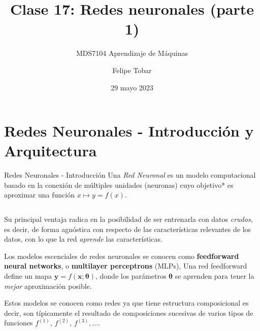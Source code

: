 \documentclass[handout, 9pt]{beamer}
\title{Clase 17: Redes neuronales (parte 1)}
\subtitle{MDS7104 Aprendizaje de Máquinas}
\date{29 mayo 2023}
\author{Felipe Tobar}
\institute{Iniciativa de Datos e Inteligencia Artificial\\Universidad de Chile}
\begin{document}
\begin{frame}
  \titlepage
\end{frame}

\section{Redes Neuronales - Introducción y Arquitectura}
\begin{frame}{Redes Neuronales - Introducción}
Una \textit{Red Neuronal} es un modelo computacional basado en la conexión de múltiples unidades (neuronas) cuyo objetivo* es aproximar una función $x\mapsto y=f(x)$.
\pause

\begin{columns}

  \begin{column}{0.5\textwidth}

  Su principal ventaja radica en la posibilidad de ser entrenarla con datos \emph{crudos}, es decir, de forma agnóstica con respecto de las características relevantes de los datos, con lo que la red \emph{aprende} las características. \pause

  \vspace{0.1cm}
  Los modelos escenciales de redes neuronales se conocen como \textbf{feedforward neural networks}, o \textbf{multilayer perceptrons} (MLPs), Una red feedforward define un mapa $\bm{y}=f(\bm{x}; \bm{\theta})$, donde los parámetros $\bm{\theta}$ se aprenden para tener la \emph{mejor} aproximación posible. \pause

  \vspace{0.1cm}

  Estos modelos se conocen como redes ya que tiene estructura composicional es decir, son típicamente el resultado de composiciones sucesivas de varios tipos de funciones $f^{(1)}$, $f^{(2)}$, $f^{(3)}, \dots$. \pause


\end{column}
\end{columns}
\end{frame}
\end{document}
